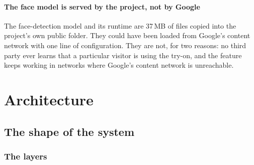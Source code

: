 \documentclass[11pt,a4paper]{report}
\begin{document}
\subsection{The face model is served by the project, not by Google}

The face-detection model and its runtime are 37\,MB of files copied into the
project's own public folder. They could have been loaded from Google's content
network with one line of configuration. They are not, for two reasons: no
third party ever learns that a particular visitor is using the try-on, and the
feature keeps working in networks where Google's content network is
unreachable.

\part{Architecture}

\chapter{The shape of the system}

\section{The layers}
\end{document}
